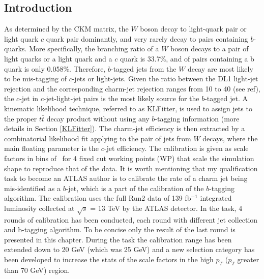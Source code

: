 \documentclass[letterpaper,12pt]{article}
\begin{document}
\subsection{Introduction}
As determined by the CKM matrix\cite{CKM1}\cite{CKM2}, the $W$ boson decay to light-quark pair or 
light quark $c$ quark pair dominantly, and very rarely decay to pairs containing $b$-quarks. 
More specifically, the branching ratio of a $W$ boson decays to a pair of light quarks or a light quark 
and a $c$ quark is 33.7\%, and of pairs containing a b quark is only 0.058\%\cite{PDG}. 
Therefore, $b$-tagged jets from the $W$ decay are most likely to be mis-tagging of $c$-jets or 
light-jets. Given the ratio between the DL1 light-jet rejection and the corresponding charm-jet rejection 
ranges from 10 to 40 (see ref\cite{ATL-PHYS-PUB-2017-013}), the 
$c$-jet in $c$-jet-light-jet pairs is the most likely source for the 
$b$-tagged jet. A kinematic likelihood technique, referred to as 
KLFitter\cite{ERDMANN201418}, is used to assign jets to the proper $t\bar{t}$ decay product 
without using any $b$-tagging information (more details in Section \ref{KLFitter}). 
The charm-jet efficiency is then extracted by a combinatorial likelihood fit applying to the pair 
of jets from $W$ decays, where the main floating parameter is the $c$-jet efficiency\cite{cjet}. 
The calibration is given as scale factors in bins of \pt\ for 4 fixed cut working points (WP) 
that scale the simulation shape to reproduce that of the data.
It is worth mentioning that my qualification task to become an ATLAS author is to 
calibrate the rate of a charm jet being mis-identified as a $b$-jet, which is a part 
of the calibration of the $b$-tagging algorithm. The calibration uses the full Run2 data 
of 139 fb$^{-1}$ integrated luminosity collected at $\sqrt{s}$ = 13 TeV by the ATLAS detector. 
In the task, 4 rounds of calibration has been conducted, each round with different jet collection 
and b-tagging algorithm. To be concise only the result of the last round is presented in this chapter. 
During the task the calibration range has been extended down to 20 GeV (which was 25 GeV) and a new 
selection category has been developed to increase the stats of the scale factors in the 
high $p_T$ ($p_T$ greater than 70 GeV) region.
\end{document}
